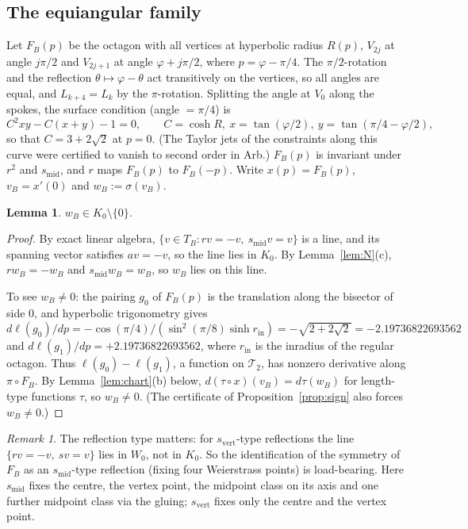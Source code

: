 \documentclass[11pt]{amsart}
\newtheorem{lemma}[theorem]{Lemma}
\theoremstyle{definition}
\theoremstyle{remark}
\newtheorem{remark}[theorem]{Remark}
\newcommand{\Teich}{\mathcal{T}_2}
\newcommand{\smid}{s_{\mathrm{mid}}}
\newcommand{\svert}{s_{\mathrm{vert}}}
\newcommand{\wB}{w_B}
\newcommand{\vB}{v_B}
\newcommand{\FB}{F_B}
\begin{document}
\subsection{The equiangular family}\label{subsec:FB}
Let $\FB(p)$ be the octagon with all vertices at hyperbolic radius $R(p)$, $V_{2j}$ at angle
$j\pi/2$ and $V_{2j+1}$ at angle $\varphi+j\pi/2$, where $p=\varphi-\pi/4$. The $\pi/2$-rotation
and the reflection $\theta\mapsto\varphi-\theta$ act transitively on the vertices, so all angles are
equal, and $L_{k+4}=L_k$ by the $\pi$-rotation. Splitting the angle at $V_0$ along the spokes, the
surface condition (angle $=\pi/4$) is
\[
C^2xy-C(x+y)-1=0,\qquad C=\cosh R,\ x=\tan(\varphi/2),\ y=\tan(\pi/4-\varphi/2),
\]
so that $C=3+2\sqrt2$ at $p=0$. (The Taylor jets of the constraints along this curve were
certified to vanish to second order in Arb.) $\FB(p)$ is invariant under $r^2$ and $\smid$, and
$r$ maps $\FB(p)$ to $\FB(-p)$. Write $x(p)=\FB(p)$, $\vB=x'(0)$ and $\wB:=\sigma(\vB)$.

\begin{lemma}\label{lem:FBline}
$\wB\in K_0\setminus\{0\}$.
\end{lemma}

\begin{proof}
By exact linear algebra, $\{v\in T_B:r v=-v,\ \smid v=v\}$ is a line, and its spanning vector
satisfies $a v=-v$, so the line lies in $K_0$. By Lemma~\ref{lem:N}(c), $r\wB=-\wB$ and
$\smid\wB=\wB$, so $\wB$ lies on this line.

To see $\wB\ne0$: the pairing $g_0$ of $\FB(p)$ is the translation along the bisector of side $0$,
and hyperbolic trigonometry gives
$d\ell(g_0)/dp=-\cos(\pi/4)/(\sin^2(\pi/8)\sinh r_{\mathrm{in}})=-\sqrt{2+2\sqrt2}=-2.19736822693562$
and $d\ell(g_1)/dp=+2.19736822693562$, where $r_{\mathrm{in}}$ is the inradius of the regular octagon.
Thus $\ell(g_0)-\ell(g_1)$, a function on $\Teich$, has nonzero derivative along $\pi\circ\FB$.
By Lemma~\ref{lem:chart}(b) below, $d(\tau\circ x)(\vB)=d\tau(\wB)$ for length-type functions $\tau$,
so $\wB\neq0$. (The certificate of Proposition~\ref{prop:sign} also forces $\wB\ne0$.)
\end{proof}

\begin{remark}
The reflection type matters: for $\svert$-type reflections the line
$\{rv=-v,\ sv=v\}$ lies in $W_0$, not in $K_0$. So the identification of the symmetry of $\FB$ as
an $\smid$-type reflection (fixing four Weierstrass points) is load-bearing. Here $\smid$ fixes
the centre, the vertex point, the midpoint class on its axis and one further midpoint class via
the gluing; $\svert$ fixes only the centre and the vertex point.
\end{remark}
\end{document}
